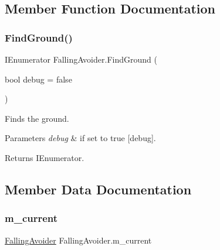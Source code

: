 \subsection{Member Function Documentation}
\mbox{\label{class_falling_avoider_a732da8b6196fadb6c6f1a1b5d853c0c0}} 
\subsubsection{\texorpdfstring{Find\+Ground()}{FindGround()}}
{\footnotesize\ttfamily I\+Enumerator Falling\+Avoider.\+Find\+Ground (\begin{DoxyParamCaption}\item[{bool}]{debug = {\ttfamily false} }\end{DoxyParamCaption})\hspace{0.3cm}{\ttfamily [inline]}}



Finds the ground. 


\begin{DoxyParams}{Parameters}
{\em debug} & if set to {\ttfamily true} \mbox{[}debug\mbox{]}.\\
\hline
\end{DoxyParams}
\begin{DoxyReturn}{Returns}
I\+Enumerator.
\end{DoxyReturn}


\subsection{Member Data Documentation}
\mbox{\label{class_falling_avoider_aefc03633515d8eb72a77c954a55d7999}} 
\subsubsection{\texorpdfstring{m\+\_\+current}{m\_current}}
{\footnotesize\ttfamily \hyperlink{class_falling_avoider}{Falling\+Avoider} Falling\+Avoider.\+m\+\_\+current\hspace{0.3cm}{\ttfamily [static]}}



